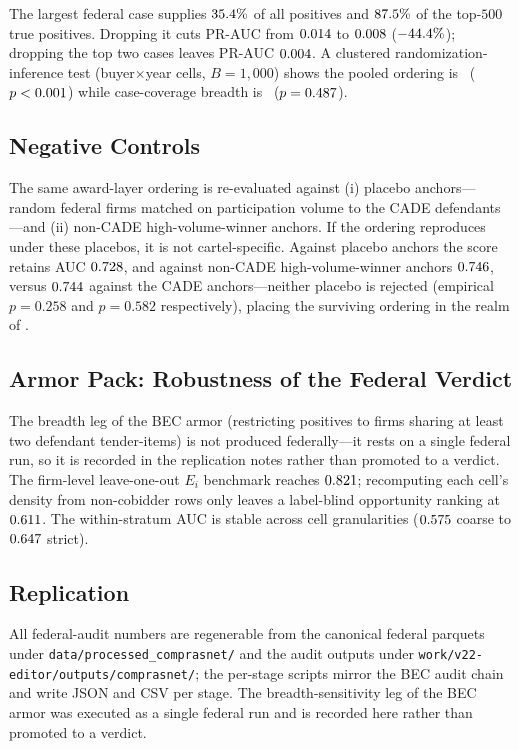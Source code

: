 The largest federal case supplies $35.4\%$ of all positives
and $87.5\%$ of the top-$500$ true positives. Dropping it cuts
PR-AUC from $0.014$ to $0.008$
($-44.4\%$); dropping the top two cases leaves PR-AUC
$0.004$. A clustered randomization-inference test
(buyer$\times$year cells, $B=1{,}000$) shows the pooled ordering is
\valFedAudClusterRIverdict\ ($p<0.001$) while case-coverage
breadth is \valFedAudClusterRIcovVerdict\ ($p=0.487$).

\subsection{Negative Controls}
\label{supp:federal_negative_controls}

The same award-layer ordering is re-evaluated against (i) placebo
anchors---random federal firms matched on participation volume to the CADE
defendants---and (ii) non-CADE high-volume-winner anchors. If the ordering
reproduces under these placebos, it is not cartel-specific. Against placebo
anchors the score retains AUC $0.728$, and against non-CADE
high-volume-winner anchors $0.746$, versus $0.744$
against the CADE anchors---neither placebo is rejected (empirical
$p=0.258$ and $p=0.582$ respectively), placing the surviving ordering in
the realm of \valFedAudNegControlVerdict.

\subsection{Armor Pack: Robustness of the Federal Verdict}
\label{supp:federal_armor}

The breadth leg of the BEC armor (restricting positives to firms sharing at
least two defendant tender-items) is not produced federally---it rests on a
single federal run, so it is recorded in the replication notes rather than
promoted to a verdict. The firm-level leave-one-out $E_i$ benchmark reaches
$0.821$; recomputing each cell's density from non-cobidder rows
only leaves a label-blind opportunity ranking at $0.611$. The
within-stratum AUC is stable across cell granularities
($0.575$ coarse to $0.647$ strict).

\subsection{Replication}
\label{supp:federal_replication}

All federal-audit numbers are regenerable from the canonical federal
parquets under \texttt{data/processed\_comprasnet/} and the audit outputs
under \texttt{work/v22-editor/outputs/comprasnet/}; the per-stage scripts
mirror the BEC audit chain and write JSON and CSV per stage. The
breadth-sensitivity leg of the BEC armor was executed as a single federal
run and is recorded here rather than promoted to a verdict.
